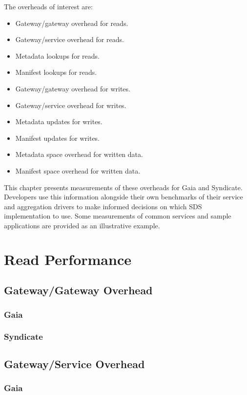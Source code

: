 The overheads of interest are:
\begin{itemize}
\item Gateway/gateway overhead for reads.
\item Gateway/service overhead for reads.
\item Metadata lookups for reads.
\item Manifest lookups for reads.
\item Gateway/gateway overhead for writes.
\item Gateway/service overhead for writes.
\item Metadata updates for writes.
\item Manifest updates for writes.
\item Metadata space overhead for written data.
\item Manifest space overhead for written data.
\end{itemize}

This chapter presents measurements of these overheads for Gaia and
Syndicate.  Developers use this information alongside their own benchmarks of
their service and aggregation drivers to make informed decisions on which SDS
implementation to use.  Some measurements of
common services and sample applications are provided as an illustrative example.

\section{Read Performance}

\subsection{Gateway/Gateway Overhead}

\subsubsection{Gaia}

\subsubsection{Syndicate}

\subsection{Gateway/Service Overhead}

\subsubsection{Gaia}

